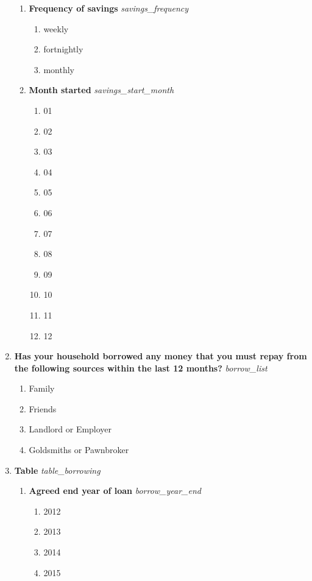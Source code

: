 \documentclass{article}
\begin{document}
\begin{enumerate}
\begin{enumerate}[label*=\arabic*.]
\item {\bfseries Frequency of savings}\emph{ savings\_frequency } 
\begin{enumerate} 
\item weekly 
\item fortnightly 
\item monthly 
\end{enumerate} 
\item {\bfseries Month started}\emph{ savings\_start\_month } 
\begin{enumerate} 
\item 01 
\item 02 
\item 03 
\item 04 
\item 05 
\item 06 
\item 07 
\item 08 
\item 09 
\item 10 
\item 11 
\item 12 
\end{enumerate} 
\end{enumerate} 
\item {\bfseries Has your household borrowed any money that you must repay from the following sources within the last 12 months?}\emph{ borrow\_list } 
\begin{enumerate} 
\item Family 
\item Friends 
\item Landlord or Employer 
\item Goldsmiths or Pawnbroker 
\end{enumerate} 

\item {\bfseries Table}\emph{ table\_borrowing } 

\begin{enumerate}[label*=\arabic*.] 
\item {\bfseries Agreed end year of loan}\emph{ borrow\_year\_end } 
\begin{enumerate} 
\item 2012 
\item 2013 
\item 2014 
\item 2015 
\end{enumerate} 


\end{enumerate}
\end{enumerate}
\end{document}
